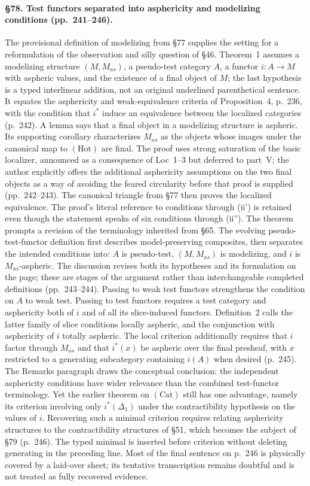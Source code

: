\paragraph{\S78. Test functors separated into asphericity and modelizing conditions (pp.\ 241--246).}
The provisional definition of modelizing from \S77 supplies the setting for a reformulation of the observation and silly question of \S46. Theorem~1 assumes a modelizing structure $(M,M_{as})$, a pseudo-test category $A$, a functor $i:A\to M$ with aspheric values, and the existence of a final object of $M$; the last hypothesis is a typed interlinear addition, not an original underlined parenthetical sentence. It equates the asphericity and weak-equivalence criteria of Proposition~4, p.\ 236, with the condition that $i^*$ induce an equivalence between the localized categories (p.\ 242). A lemma says that a final object in a modelizing structure is aspheric. Its supporting corollary characterizes $M_{as}$ as the objects whose images under the canonical map to $(\mathrm{Hot})$ are final. The proof uses strong saturation of the basic localizer, announced as a consequence of Loc~1--3 but deferred to part~V; the author explicitly offers the additional asphericity assumptions on the two final objects as a way of avoiding the feared circularity before that proof is supplied (pp.\ 242--243). The canonical triangle from \S77 then proves the localized equivalence. The proof's literal reference to conditions through (ii') is retained even though the statement speaks of six conditions through (ii'').
The theorem prompts a revision of the terminology inherited from \S65. The evolving pseudo-test-functor definition first describes model-preserving composites, then separates the intended conditions into: $A$ is pseudo-test, $(M,M_{as})$ is modelizing, and $i$ is $M_{as}$-aspheric. The discussion revises both its hypotheses and its formulation on the page; these are stages of the argument rather than interchangeable completed definitions (pp.\ 243--244). Passing to weak test functors strengthens the condition on $A$ to weak test. Passing to test functors requires a test category and asphericity both of $i$ and of all its slice-induced functors. Definition~2 calls the latter family of slice conditions locally aspheric, and the conjunction with asphericity of $i$ totally aspheric. The local criterion additionally requires that $i$ factor through $M_{as}$ and that $i^*(x)$ be aspheric over the final presheaf, with $x$ restricted to a generating subcategory containing $i(A)$ when desired (p.\ 245). The Remarks paragraph draws the conceptual conclusion: the independent asphericity conditions have wider relevance than the combined test-functor terminology. Yet the earlier theorem on $(\mathrm{Cat})$ still has one advantage, namely its criterion involving only $i^*(\Delta_1)$ under the contractibility hypothesis on the values of $i$. Recovering such a minimal criterion requires relating asphericity structures to the contractibility structures of \S51, which becomes the subject of \S79 (p.\ 246). The typed minimal is inserted before criterion without deleting generating in the preceding line. Most of the final sentence on p.\ 246 is physically covered by a laid-over sheet; its tentative transcription remains doubtful and is not treated as fully recovered evidence.


